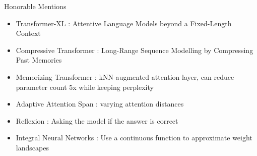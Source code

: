 \begin{frame}[c]{Honorable Mentions}
    \begin{itemize}[<+(1)->]
        \item Transformer-XL \cite{dai_transformerxl_2019}: Attentive Language Models beyond a Fixed-Length Context
        \item Compressive Transformer \cite{rae_compressive_2019}: Long-Range Sequence Modelling by Compressing Past Memories
        \item Memorizing Transformer \cite{wu_memorizing_2022}: kNN-augmented attention layer, can reduce parameter count 5x while keeping perplexity
        \item Adaptive Attention Span \cite{sukhbaatar_adaptive_2019}: varying attention distances
        \item Reflexion \cite{shinn_reflexion_2023}: Asking the model if the answer is correct
        \item Integral Neural Networks \cite{solodskikh_integral}: Use a continuous function to approximate weight landscapes
    \end{itemize}
\end{frame}
